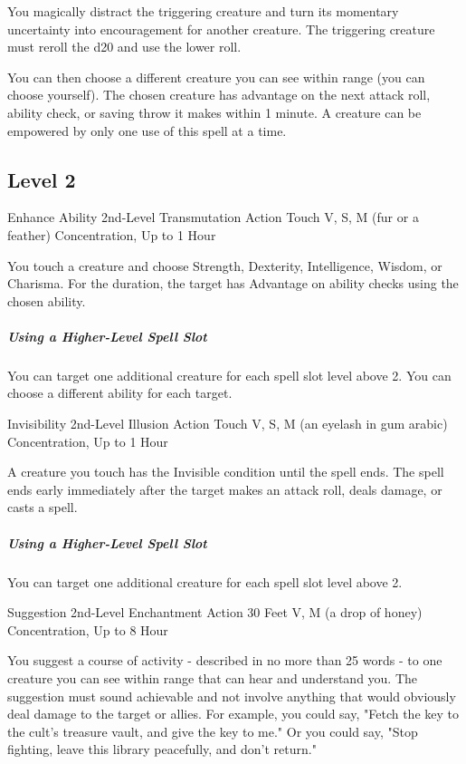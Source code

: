 \documentclass[letterpaper,openany,oneside,twocolumn]{book}
\begin{document}
You magically distract the triggering creature and turn its momentary uncertainty into encouragement for another creature. The triggering creature must reroll the d20 and use the lower roll.

You can then choose a different creature you can see within range (you can choose yourself). The chosen creature has advantage on the next attack roll, ability check, or saving throw it makes within 1 minute. A creature can be empowered by only one use of this spell at a time.

\subsection*{Level 2}

\DndSpellHeader
  {Enhance Ability}
  {2nd-Level Transmutation}
  {Action}
  {Touch}
  {V, S, M (fur or a feather)}
  {Concentration, Up to 1 Hour}

You touch a creature and choose Strength, Dexterity, Intelligence, Wisdom, or Charisma. For the duration, the target has Advantage on ability checks using the chosen ability.

\subparagraph*{Using a Higher-Level Spell Slot} You can target one additional creature for each spell slot level above 2. You can choose a different ability for each target.

\DndSpellHeader
  {Invisibility}
  {2nd-Level Illusion}
  {Action}
  {Touch}
  {V, S, M (an eyelash in gum arabic)}
  {Concentration, Up to 1 Hour}

A creature you touch has the Invisible condition until the spell ends. The spell ends early immediately after the target makes an attack roll, deals damage, or casts a spell.

\subparagraph*{Using a Higher-Level Spell Slot} You can target one additional creature for each spell slot level above 2.

\DndSpellHeader
  {Suggestion}
  {2nd-Level Enchantment}
  {Action}
  {30 Feet}
  {V, M (a drop of honey)}
  {Concentration, Up to 8 Hour}

You suggest a course of activity - described in no more than 25 words - to one creature you can see within range that can hear and understand you. The suggestion must sound achievable and not involve anything that would obviously deal damage to the target or allies. For example, you could say, "Fetch the key to the cult's treasure vault, and give the key to me." Or you could say, "Stop fighting, leave this library peacefully, and don't return."
\end{document}
